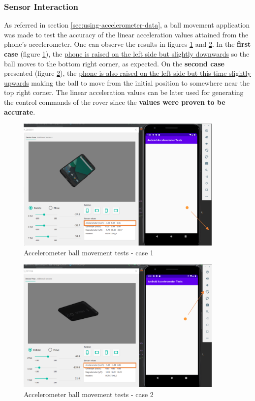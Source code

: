 %
\subsubsection{Sensor Interaction}
\label{sec:accelerometer-using-data-test}
%
As referred in section \ref{sec:using-accelerometer-data}, a ball movement application was made to test the accuracy of the linear acceleration values attained from the phone's accelerometer. One can observe the results in figures \ref{fig:ball-mov-test1} and \ref{fig:ball-mov-test2}. In the \textbf{first case} (figure \ref{fig:ball-mov-test1}), the \underline{phone is raised on the left side but slightly downwards} so the ball moves to the bottom right corner, as expected. On the \textbf{second case} presented (figure \ref{fig:ball-mov-test2}), the \underline{phone is also raised on the left side but this time slightly upwards} making the ball to move from the initial position to somewhere near the top right corner. The linear acceleration values can be later used for generating the control commands of the rover since the \textbf{values were proven to be accurate}.
%
\begin{figure}[!ht]
\centering
\includegraphics[width=0.9\textwidth]{img/ball-mov-test1.png}
\caption{\label{fig:ball-mov-test1}Accelerometer ball movement tests - case 1}
\end{figure}
%
\begin{figure}[!ht]
\centering
\includegraphics[width=0.9\textwidth]{img/ball-mov-test2.png}
\caption{\label{fig:ball-mov-test2}Accelerometer ball movement tests - case 2}
\end{figure}
